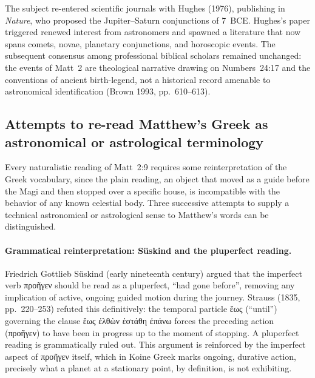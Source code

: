 \documentclass[11pt,a4paper]{article}
\newcommand{\grk}[1]{{\fontencoding{LGR}\selectfont #1}}
\newcommand{\grk}[1]{{\greekfont #1}}
\begin{document}
The subject re-entered scientific journals with Hughes (1976)\cite{hughes1976}, publishing in
\textit{Nature}, who proposed the Jupiter--Saturn conjunctions of 7~BCE. Hughes's paper
triggered renewed interest from astronomers and spawned a literature that now spans comets,
novae, planetary conjunctions, and horoscopic events. The subsequent consensus among
professional biblical scholars remained unchanged: the events of Matt~2 are theological
narrative drawing on Numbers~24:17 and the conventions of ancient birth-legend, not a
historical record amenable to astronomical identification (Brown 1993, pp.~610--613)\cite{brown1993}.

\subsection{Attempts to re-read Matthew's Greek as astronomical or astrological terminology}

Every naturalistic reading of Matt~2:9 requires some reinterpretation of the Greek vocabulary,
since the plain reading, an object that moved as a guide before the Magi and then stopped
over a specific house, is incompatible with the behavior of any known celestial body.
Three successive attempts to supply a technical astronomical or astrological sense to Matthew's
words can be distinguished.

\paragraph{Grammatical reinterpretation: S\"{u}skind and the pluperfect reading.}
Friedrich Gottlieb S\"{u}skind (early nineteenth century) argued that the imperfect verb
\grk{προῆγεν} should be read as a pluperfect, ``had gone before'', removing any implication
of active, ongoing guided motion during the journey. Strauss (1835, pp.~220--253)\cite{strauss1835}
refuted this definitively: the temporal particle \grk{ἕως} (``until'') governing the clause
\grk{ἕως ἐλθὼν ἐστάθη ἐπάνω} forces the preceding action (\grk{προῆγεν}) to have been in
progress up to the moment of stopping. A pluperfect reading is grammatically ruled out.
This argument is reinforced by the imperfect aspect of \grk{προῆγεν} itself, which in Koine
Greek marks ongoing, durative action, precisely what a planet at a stationary point, by
definition, is not exhibiting.
\end{document}
